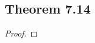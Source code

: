 \documentclass[../../main.tex]{subfiles}
\begin{document}
\subsection{Theorem 7.14}
\begin{wts}

\end{wts}
\begin{proof}

\end{proof}
\end{document}
